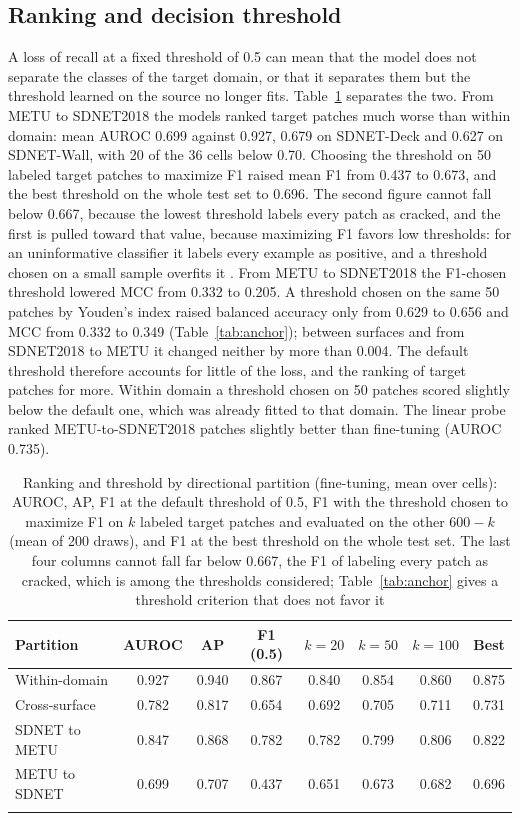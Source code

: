 \documentclass[pdflatex,sn-apa]{sn-jnl}
\begin{document}
\subsection{Ranking and decision threshold}\label{sec:res-threshold}

A loss of recall at a fixed threshold of 0.5 can mean that the model does not separate the classes of the target domain, or that it separates them but the threshold learned on the source no longer fits. Table~\ref{tab:threshold} separates the two. From METU to SDNET2018 the models ranked target patches much worse than within domain: mean AUROC 0.699 against 0.927, 0.679 on SDNET-Deck and 0.627 on SDNET-Wall, with 20 of the 36 cells below 0.70. Choosing the threshold on 50 labeled target patches to maximize F1 raised mean F1 from 0.437 to 0.673, and the best threshold on the whole test set to 0.696. The second figure cannot fall below 0.667, because the lowest threshold labels every patch as cracked, and the first is pulled toward that value, because maximizing F1 favors low thresholds: for an uninformative classifier it labels every example as positive, and a threshold chosen on a small sample overfits it \citep{lipton2014}. From METU to SDNET2018 the F1-chosen threshold lowered MCC from 0.332 to 0.205. A threshold chosen on the same 50 patches by Youden's index raised balanced accuracy only from 0.629 to 0.656 and MCC from 0.332 to 0.349 (Table~\ref{tab:anchor}); between surfaces and from SDNET2018 to METU it changed neither by more than 0.004. The default threshold therefore accounts for little of the loss, and the ranking of target patches for more. Within domain a threshold chosen on 50 patches scored slightly below the default one, which was already fitted to that domain. The linear probe ranked METU-to-SDNET2018 patches slightly better than fine-tuning (AUROC 0.735).

\begin{table}[t]
\caption{Ranking and threshold by directional partition (fine-tuning, mean over cells): AUROC, AP, F1 at the default threshold of 0.5, F1 with the threshold chosen to maximize F1 on $k$ labeled target patches and evaluated on the other $600-k$ (mean of 200 draws), and F1 at the best threshold on the whole test set. The last four columns cannot fall far below 0.667, the F1 of labeling every patch as cracked, which is among the thresholds considered; Table~\ref{tab:anchor} gives a threshold criterion that does not favor it}\label{tab:threshold}
\begin{tabular*}{\textwidth}{@{\extracolsep\fill}lccccccc@{}}
\toprule
Partition & AUROC & AP & F1 (0.5) & $k=20$ & $k=50$ & $k=100$ & Best \\
\midrule
Within-domain & 0.927 & 0.940 & 0.867 & 0.840 & 0.854 & 0.860 & 0.875 \\
Cross-surface & 0.782 & 0.817 & 0.654 & 0.692 & 0.705 & 0.711 & 0.731 \\
SDNET to METU & 0.847 & 0.868 & 0.782 & 0.782 & 0.799 & 0.806 & 0.822 \\
METU to SDNET & 0.699 & 0.707 & 0.437 & 0.651 & 0.673 & 0.682 & 0.696 \\
\botrule
\end{tabular*}
\end{table}
\end{document}
